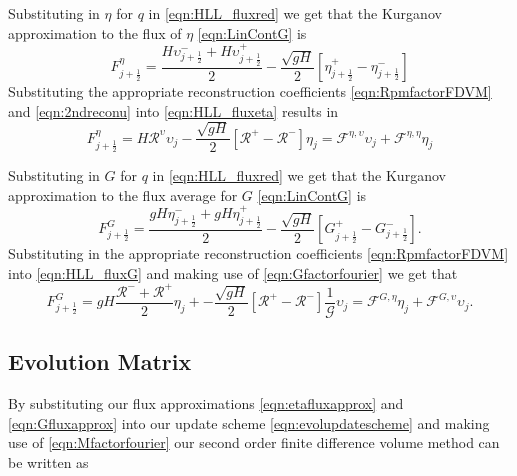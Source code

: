 Substituting in $\eta$ for $q$ in \eqref{eqn:HLL_fluxred} we get that the Kurganov approximation to the flux of $\eta$ \eqref{eqn:LinContG} is
\begin{equation}
\label{eqn:HLL_fluxeta}
F^{\eta}_{j+\frac{1}{2}} = \dfrac{ H \upsilon ^-_{j+\frac{1}{2}}+ H \upsilon ^+_{j+\frac{1}{2}}}{ 2}  - \dfrac{ \sqrt{gH}}{ 2} \left [ \eta^+_{j+\frac{1}{2}} - \eta^-_{j+\frac{1}{2}} \right ]
\end{equation}
Substituting the appropriate reconstruction coefficients \eqref{eqn:RpmfactorFDVM} and \eqref{eqn:2ndreconu} into \eqref{eqn:HLL_fluxeta} results in
\begin{equation}
\label{eqn:etafluxapprox}
F^{\eta}_{j+\frac{1}{2}} = H \mathcal{R}^\upsilon \upsilon_{j}   - \dfrac{ \sqrt{gH}}{ 2} \left [  \mathcal{R}^+ -  \mathcal{R}^- \right ] {\eta}_j  = \mathcal{F}^{\eta,\upsilon} \upsilon_{j}   +  \mathcal{F}^{\eta,\eta} {\eta}_j
\end{equation}

Substituting in $G$ for $q$ in \eqref{eqn:HLL_fluxred} we get that the Kurganov approximation to the flux average for $G$ \eqref{eqn:LinContG} is
\begin{equation}
\label{eqn:HLL_fluxG}
F^{G}_{j+\frac{1}{2}} = \dfrac{ gH \eta ^-_{j+\frac{1}{2}}+ gH \eta ^+_{j+\frac{1}{2}}}{ 2}  - \dfrac{ \sqrt{gH}}{ 2} \left [ G^+_{j+\frac{1}{2}} - G^-_{j+\frac{1}{2}} \right ].
\end{equation}
Substituting in the appropriate reconstruction coefficients \eqref{eqn:RpmfactorFDVM} into \eqref{eqn:HLL_fluxG} and making use of \eqref{eqn:Gfactorfourier} we get that
\begin{equation}
\label{eqn:Gfluxapprox}
F^{G}_{j+\frac{1}{2}} = gH \dfrac{\mathcal{R}^- + \mathcal{R}^+ }{ 2} \eta_j + - \dfrac{ \sqrt{gH}}{ 2} \left [  \mathcal{R}^+ -  \mathcal{R}^- \right ] \frac{1}{\mathcal{G}} \upsilon_j =  \mathcal{F}^{G,\eta} \eta_{j}  + \mathcal{F}^{G,\upsilon}\upsilon_j.
\end{equation}

\subsection{Evolution Matrix}

By substituting our flux approximations \eqref{eqn:etafluxapprox} and \eqref{eqn:Gfluxapprox} into our update scheme \eqref{eqn:evolupdatescheme} and making use of \eqref{eqn:Mfactorfourier} our second order finite difference volume method can be written as

